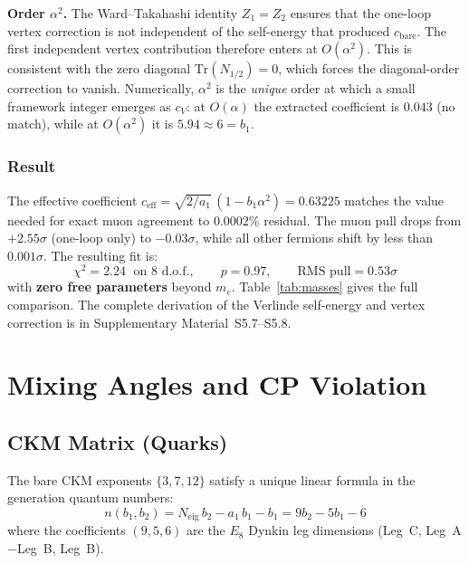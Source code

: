 \documentclass[12pt,a4paper]{article}
\theoremstyle{definition}
\begin{document}
\textbf{Order $\alpha^2$.}  The Ward--Takahashi identity $Z_1 = Z_2$ ensures that the one-loop vertex correction is not independent of the self-energy that produced $c_{\mathrm{bare}}$.  The first independent vertex contribution therefore enters at $O(\alpha^2)$.  This is consistent with the zero diagonal $\mathrm{Tr}(N_{1/2}) = 0$, which forces the diagonal-order correction to vanish.  Numerically, $\alpha^2$ is the \emph{unique} order at which a small framework integer emerges as $c_V$: at $O(\alpha)$ the extracted coefficient is $0.043$ (no match), while at $O(\alpha^2)$ it is $5.94 \approx 6 = b_1$.

\subsubsection*{Result}

The effective coefficient $c_{\mathrm{eff}} = \sqrt{2/a_1}\,(1 - b_1\alpha^2) = 0.63225$ matches the value needed for exact muon agreement to $0.0002\%$ residual.  The muon pull drops from $+2.55\sigma$ (one-loop only) to $-0.03\sigma$, while all other fermions shift by less than $0.001\sigma$.  The resulting fit is:
\begin{equation}
\chi^2 = 2.24 \;\text{ on 8 d.o.f.}, \qquad p = 0.97, \qquad \text{RMS pull} = 0.53\sigma
\label{eq:chi2_vertex}
\end{equation}
with \textbf{zero free parameters} beyond $m_e$.  Table~\ref{tab:masses} gives the full comparison.  The complete derivation of the Verlinde self-energy and vertex correction is in Supplementary Material~S5.7--S5.8.




\section{Mixing Angles and CP Violation}
\label{sec:mixing_cp}

\subsection{CKM Matrix (Quarks)}
\label{sec:ckm}

The bare CKM exponents $\{3, 7, 12\}$ satisfy a unique linear formula in the generation quantum numbers:
\begin{equation}
\boxed{n(b_1, b_2) = N_{\text{eig}}\, b_2 - a_1\, b_1 - b_1 = 9b_2 - 5b_1 - 6}
\end{equation}
where the coefficients $(9, 5, 6)$ are the $E_8$ Dynkin leg dimensions (Leg~C, Leg~A$-$Leg~B, Leg~B).
\end{document}
